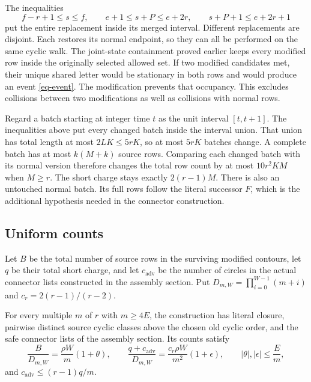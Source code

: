 The inequalities
\[
 f-r+1\le s\le f,\qquad
 e+1\le s+P\le e+2r,\qquad s+P+1\le e+2r+1
\]
put the entire replacement inside its merged interval. Different
replacements are disjoint. Each restores its normal endpoint, so they can
all be performed on the same cyclic walk. The joint-state containment
proved earlier keeps every modified row inside the originally selected
allowed set. If two modified candidates met, their unique shared letter
would be stationary in both rows and would produce an event
\eqref{eq-event}. The modification prevents that occupancy. This excludes
collisions between two modifications as well as collisions with normal
rows.

Regard a batch starting at integer time $t$ as the unit interval $[t,t+1]$.
The inequalities above put every changed batch inside the interval union.
That union has total length at most $2LK\le5rK$, so at most $5rK$
batches change. A complete batch has
at most $k(M+k)$ source rows. Comparing each changed batch with its normal
version therefore changes the total row count by at most $10r^2KM$ when
$M\ge r$. The short charge stays exactly $2(r-1)M$. There is also an
untouched normal batch. Its full rows follow the literal successor $F$,
which is the additional hypothesis needed in the connector construction.

\subsection{Uniform counts}

Let $B$ be the total number of source rows in the surviving modified
contours, let $q$ be their total short charge, and let $c_{\mathrm{adv}}$
be the number of circles in the actual connector lists constructed in the
assembly section. Put
$D_{m,W}=\prod_{i=0}^{W-1}(m+i)$ and $c_r=2(r-1)/(r-2)$.

\begin{proposition}\label{prop-global-counts}
For every multiple $m$ of $r$ with $m\ge4E$, the construction has literal
closure, pairwise distinct source cyclic classes above the chosen old
cyclic order, and the safe connector lists of the assembly section. Its counts satisfy
\[
 \frac{B}{D_{m,W}}=\frac{\rho W}{m}(1+\theta),\qquad
 \frac{q+c_{\mathrm{adv}}}{D_{m,W}}
   =\frac{c_r\rho W}{m^2}(1+\epsilon),\qquad
 |\theta|,|\epsilon|\le\frac Em,
\]
and $c_{\mathrm{adv}}\le(r-1)q/m$.
\end{proposition}

